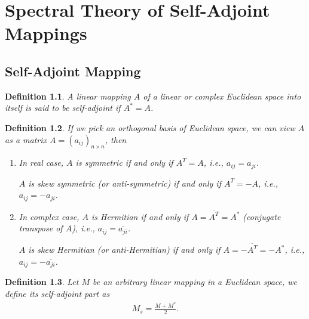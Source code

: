 \documentclass[11pt]{book}
\newtheorem{definition}{Definition}[section]
\theoremstyle{definition}
\numberwithin{equation}{chapter}
\begin{document}
\chapter{Spectral Theory of Self-Adjoint Mappings}
\section{Self-Adjoint Mapping}
\begin{definition}
A linear mapping $A$ of a linear or complex Euclidean space into itself is said to be self-adjoint if $A^* = A$.
\end{definition}

\begin{definition}
If we pick an orthogonal basis of Euclidean space, we can view $A$ as a matrix $A = (a_{ij})_{n\times n}$, then 
\begin{enumerate}[label=(\arabic*)]
    \item In real case, $A$ is symmetric if and only if $A^T = A$, i.e., $a_{ij} = a_{ji}$.
    
    $A$ is skew symmetric (or anti-symmetric) if and only if $A^T = -A$, i.e., $a_{ij} = -a_{ji}$.
    
    \item In complex case, $A$ is Hermitian if and only if $A = \overline{A^T} = A^*$ (conjugate transpose of $A$), i.e., $a_{ij} = \overline{a_{ji}}$.
    
    $A$ is skew Hermitian (or anti-Hermitian) if and only if $A = - \overline{A^T} = - A^*$, i.e., $a_{ij} = - \overline{a_{ji}}$.
\end{enumerate}
\end{definition}

\medskip

\begin{definition}
Let $M$ be an arbitrary linear mapping in a Euclidean space, we define its self-adjoint part as 
\begin{align*}
    M_s = \frac{M + M^*}{2}.
\end{align*}
\end{definition}

\medskip
\end{document}
